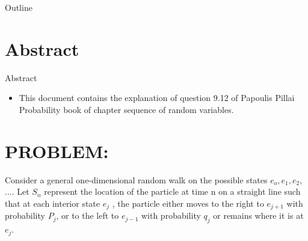 \documentclass{beamer}
\title{\typedef{ASSIGNMENT-8}}
\author{MUSKAN JAISWAL -cs21btech11037}
\date{May 2022}
\title{\typedef{ASSIGNMENT-9}}
\author{MUSKAN JAISWAL -cs21btech11037}
\date{May 2022}
\begin{document}
\begin{frame}{Outline}
  \tableofcontents
\end{frame}
\section{Abstract}
	\begin{frame}{Abstract}
		\begin{itemize}
			\item 	This document contains the explanation of question  9.12  of Papoulis Pillai Probability book of chapter sequence of random variables.
		\end{itemize}
	\end{frame}
	
\maketitle

\section{PROBLEM:}
\begin{frame}{}
\begin{block}{}
Consider a general one-dimensional random walk on the possible states $e_o, e_1, e_2,$ .... 
Let $S_n$ represent the location of the particle at time n on a straight line such that at each 
interior state  $e_j$ , the particle either moves to the right to $e_{j+ 1}$ with probability $P_j$, or to 
the left to $e_{j-1}$ with probability $q_j$ or remains where it is at $e_j$.

\end{block}
\end{frame}
\end{document}
